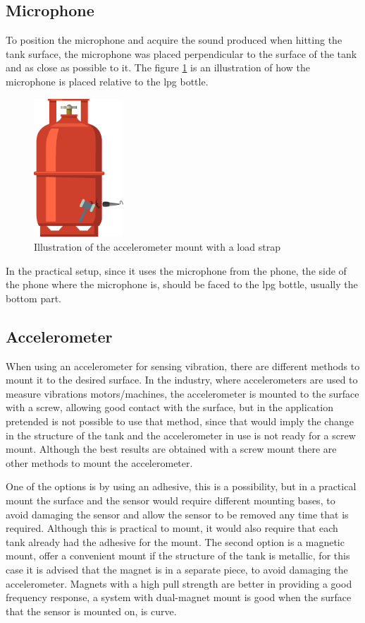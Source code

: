 \subsection{Microphone}
To position the microphone and acquire the sound produced when hitting the tank surface, the microphone was placed perpendicular to the surface of the tank and as close as possible to it. The figure \ref{fig:micmount} is an illustration of how the microphone is placed relative to the \acrshort{lpg} bottle.
\begin{figure}[]
    \centering
    \includegraphics[width=0.3\textwidth]{Chapters/4CHP/Figures/micWimpactHamm.eps}
    \caption{Illustration of the accelerometer mount with a load strap}
    \label{fig:micmount}
\end{figure}
In the practical setup, since it uses the microphone from the phone, the side of the phone where the microphone is, should be faced to the \acrshort{lpg} bottle, usually the bottom part.
\subsection{Accelerometer}
When using an accelerometer for sensing vibration, there are different methods to mount it to the desired surface. In the industry, where accelerometers are used to measure vibrations motors/machines, the accelerometer is mounted to the surface with a screw, allowing good contact with the surface, but in the application pretended is not possible to use that method, since that would imply the change in the structure of the tank and the accelerometer in use is not ready for a screw mount. Although the best results are obtained with a screw mount there are other methods to mount the accelerometer. 

One of the options is by using an adhesive, this is a possibility, but in a practical mount the surface and the sensor would require different mounting bases, to avoid damaging the sensor and allow the sensor to be removed any time that is required. Although this is practical to mount, it would also require that each tank already had the adhesive for the mount. The second option is a magnetic mount, offer a convenient mount if the structure of the tank is metallic, for this case it is advised that the magnet is in a separate piece, to avoid damaging the accelerometer. Magnets with a high pull strength are better in providing a good frequency response, a system with dual-magnet mount is good when the surface that the sensor is mounted on, is curve\cite{GuidelinesMountingTest}.

